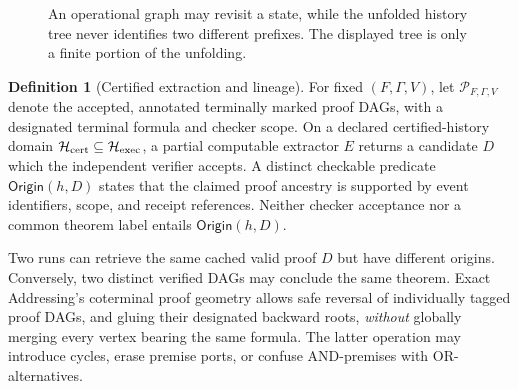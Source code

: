 \documentclass[11pt,letterpaper]{article}
\theoremstyle{definition}
\newtheorem{definition}[theorem]{Definition}
\newcommand{\Hh}{\mathcal H}
\begin{document}
\begin{figure}[htbp]\centering
{}
\caption{An operational graph may revisit a state, while the unfolded history tree never identifies two different prefixes. The displayed tree is only a finite portion of the unfolding.}
\label{fig:history-geometry}
\end{figure}

\begin{definition}[Certified extraction and lineage]
For fixed $(F,\Gamma,V)$, let $\mathcal P_{F,\Gamma,V}$ denote the accepted, annotated terminally marked proof DAGs, with a designated terminal formula and checker scope. On a declared certified-history domain $\Hh_{\rm cert}\subseteq\Hh_{\rm exec}$, a partial computable extractor $E$ returns a candidate $D$ which the independent verifier accepts. A distinct checkable predicate $\mathsf{Origin}(h,D)$ states that the claimed proof ancestry is supported by event identifiers, scope, and receipt references. Neither checker acceptance nor a common theorem label entails $\mathsf{Origin}(h,D)$.
\end{definition}

Two runs can retrieve the same cached valid proof $D$ but have different origins. Conversely, two distinct verified DAGs may conclude the same theorem. Exact Addressing's coterminal proof geometry allows safe reversal of individually tagged proof DAGs, and gluing their designated backward roots, \emph{without} globally merging every vertex bearing the same formula. The latter operation may introduce cycles, erase premise ports, or confuse AND-premises with OR-alternatives.
\end{document}

